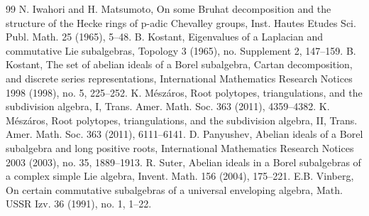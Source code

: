 \documentclass[10pt]{amsart}
\theoremstyle{definition}
\theoremstyle{remark}
\begin{document}
\begin{thebibliography}{99}
 N. Iwahori and H. Matsumoto, On some Bruhat decomposition and the structure of the Hecke rings of p-adic Chevalley groups, Inst. Hautes Etudes Sci. Publ. Math. 25 (1965), 5--48.
 B. Kostant, Eigenvalues of a Laplacian and commutative Lie subalgebras, Topology 3 (1965), no. Supplement 2, 147--159.
 B. Kostant, The set of abelian ideals of a Borel subalgebra, Cartan decomposition, and discrete series representations, International Mathematics Research Notices 1998 (1998), no. 5, 225--252.
 K. M\'esz\'aros, Root polytopes, triangulations, and the subdivision algebra, I, Trans. Amer. Math. Soc. 363 (2011), 4359--4382.
 K. M\'esz\'aros, Root polytopes, triangulations, and the subdivision algebra, II, Trans. Amer. Math. Soc. 363 (2011), 6111--6141.
 D. Panyushev, Abelian ideals of a Borel subalgebra and long positive roots, International Mathematics Research Notices 2003 (2003), no. 35, 1889--1913.
 R. Suter, Abelian ideals in a Borel subalgebras of a complex simple Lie algebra, Invent. Math. 156 (2004), 175--221.
 E.B. Vinberg, On certain commutative subalgebras of a universal enveloping algebra, Math. USSR Izv. 36 (1991), no. 1, 1--22.
\end{thebibliography}
\end{document}
